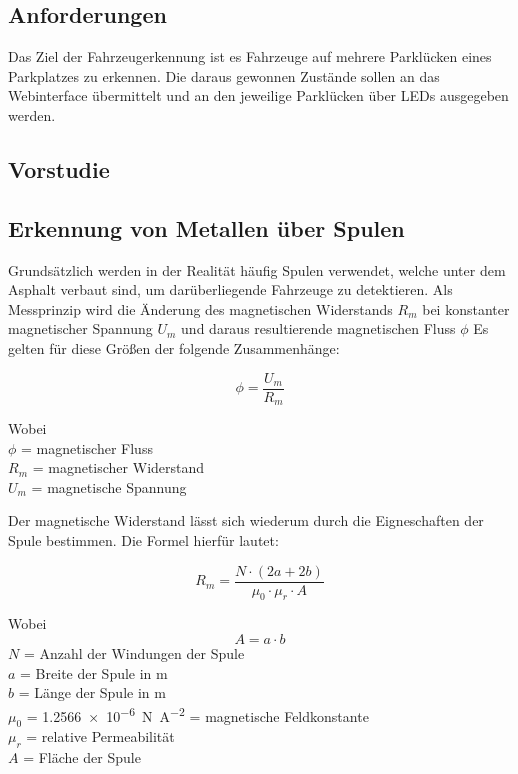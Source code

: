 \def \sectionauthors {Dennis Köb}
\subsection{Anforderungen}
Das Ziel der Fahrzeugerkennung ist es Fahrzeuge auf mehrere Parklücken eines Parkplatzes zu erkennen. Die daraus 
gewonnen Zustände sollen an das Webinterface übermittelt und an den jeweilige Parklücken über LEDs ausgegeben werden. 
\subsection{Vorstudie}

\subsection{Erkennung von Metallen über Spulen}
Grundsätzlich werden in der Realität häufig Spulen verwendet, welche unter dem Asphalt verbaut sind, um darüberliegende
Fahrzeuge zu detektieren. Als Messprinzip wird die Änderung des magnetischen Widerstands $R_{m}$ bei konstanter magnetischer Spannung $U_{m}$ und
daraus resultierende magnetischen Fluss $\phi$
Es gelten für diese Größen der folgende Zusammenhänge:

\begin{equation} \label{eq:phi}
    \phi = \frac{U_{m}}{R_{m}}
\end{equation}

Wobei \\
$\phi$ = magnetischer Fluss \\
$R_{m}$ = magnetischer Widerstand \\
$U_{m}$ = magnetische Spannung
\pagebreak

Der magnetische Widerstand lässt sich wiederum durch die Eigneschaften der Spule bestimmen. Die Formel hierfür lautet:

\begin{equation} \label{eq:Rm}
    R_{m} = \frac{N \cdot (2a + 2b)}{\mu_{0} \cdot \mu_{r} \cdot A} 
\end{equation}


Wobei \\
\begin{equation} \label{eq:A}
    A = a \cdot b
\end{equation}
$N$ = Anzahl der Windungen der Spule \\
$a$ = Breite der Spule in m \\
$b$ = Länge der Spule in m\\
$\mu_{0}$ = \SI[per-mode = symbol]{1.2566e-6}{\newton\per\ampere\squared} = magnetische Feldkonstante \\
$\mu_{r}$ = relative Permeabilität  \\
$A$ = Fläche der Spule

